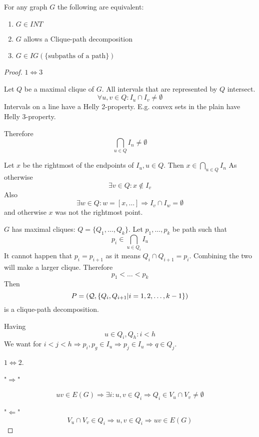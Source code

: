 \begin{theorem}
	For any graph $G$ the following are equivalent:
	\begin{enumerate}
		\item $G \in INT$
		\item $G$ allows a Clique-path decomposition
		\item $G \in IG(\{\text{subpaths of a path}\})$
	\end{enumerate}
\end{theorem}
\begin{proof}
	$1 \iff 3$

	Let $Q$ be a maximal clique of $G$.
	All intervals that are represented by $Q$ intersect.
	\[ \forall u,v \in Q: I_u \cap I_v \ne \emptyset \]
	Intervals on a line have a Helly 2-property.
	E.g. convex sets in the plain have Helly 3-property.

	Therefore
	\[ \bigcap_{u \in Q} I_n \ne \emptyset \]

	Let $x$ be the rightmost of the endpoints of $I_u, u \in Q$.
	Then $x \in \bigcap_{u \in Q} I_n$
	As otherwise
	\[ \exists v \in Q: x \notin I_v \]
	Also
	\[ \exists w \in Q: w = [x, \ldots] \Rightarrow I_v \cap I_w = \emptyset \]
	and otherwise $x$ was not the rightmost point.

	$G$ has maximal cliques: $Q = \{ Q_1, \ldots, Q_k \}$.
	Let $p_1, \ldots, p_k$ be path such that
	\[ p_i \in \bigcap_{u \in Q_i} I_u \]
	It cannot happen that $p_i = p_{i + 1}$ as it means $Q_i \cap Q_{i + 1} = p_i$.
	Combining the two will make a larger clique.
	Therefore
	\[ p_1 < \ldots < p_k \]
	Then
	\[ P = (\operatorname{\mathcal{Q}}, \{ Q_i, Q_{i + 1} | i = 1, 2, \ldots, k - 1 \}) \]
	is a clique-path decomposition.

	Having
	\[ u \in Q_i, Q_h: i < h \]
	We want for $i < j < h \Rightarrow p_i, p_g \in I_u \Rightarrow p_j \in I_u \Rightarrow q \in Q_j$.

	$1 \iff 2$.

	"$\Rightarrow$"

	\[ uv \in E(G) \Rightarrow \exists i: u,v \in Q_i \Rightarrow Q_i \in V_u \cap V_v \ne \emptyset \]

	"$\Leftarrow$"
	\[ V_u \cap V_v \in Q_i \Rightarrow u,v \in Q_i \Rightarrow  uv \in E(G) \]

\end{proof}

